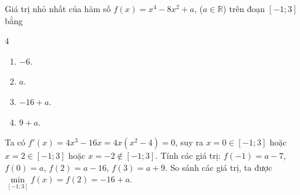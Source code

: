 \begin{baitap}
	Giá trị nhỏ nhất của hàm số $f(x)=x^4-8x^2+a$, ($a\in\mathbb{R}$) trên đoạn $[-1; 3]$ bằng
	\begin{multicols}{4}
		\begin{enumerate}
			\item $-6$.
			\item $a$.
			\item $-16+a$.
			\item $9+a$.
		\end{enumerate}
	\end{multicols}
	\begin{traloi}
		Ta có $f'(x)=4x^3-16x=4x(x^2-4)=0$, suy ra $x=0 \in [-1; 3]$ hoặc $x=2 \in [-1; 3]$ hoặc $x=-2 \notin [-1; 3]$.
		Tính các giá trị: $f(-1)=a-7$, $f(0)=a$, $f(2)=a-16$, $f(3)=a+9$.
		So sánh các giá trị, ta được $\min\limits_{[-1; 3]} f(x) = f(2) = -16+a$.
	\end{traloi}
\end{baitap}


